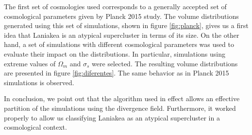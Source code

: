 \documentclass[usenatbib]{mnras}
\begin{document}
The first set of cosmologies used corresponds to a generally accepted set of cosmological parameters given by Planck 2015 study. The volume distributions generated using this set of simulations, shown in figure \ref{fig:planck}, gives us a first idea that Laniakea is an atypical supercluster in terms of its size. On the other hand, a set of simulations with different cosmological parameters was used to evaluate their impact on the distributions. In particular, simulations using extreme values of $\Omega_m$ and $\sigma_s$ were selected. The resulting volume distributions are presented in figure \ref{fig:diferentes}. The same behavior as in Planck 2015 simulations is observed. 

In conclusion, we point out that the algorithm used in effect allows an effective partition of the simulations using the divergence field. Furthermore, it worked properly to allow us classifying Laniakea as an atypical supercluster in a cosmological context.






\end{document}
